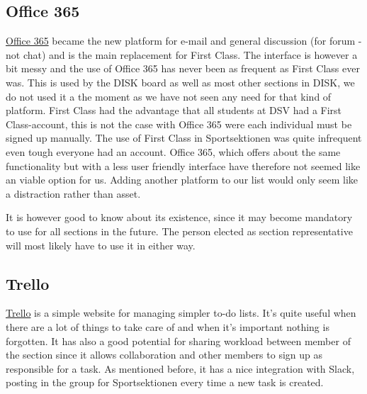 \documentclass[12pt,a4paper]{article}
\begin{document}
		\subsection{Office 365}
			\href{http://portal.office.com}{Office 365} became the new platform for e-mail and general discussion (for forum - not chat) and is the main replacement for First Class. The interface is however a bit messy and the use of Office 365 has never been as frequent as First Class ever was. This is used by the DISK board as well as most other sections in DISK, we do not used it a the moment as we have not seen any need for that kind of platform. First Class had the advantage that all students at DSV had a First Class-account, this is not the case with Office 365 were each individual must be signed up manually. The use of First Class in Sportsektionen was quite infrequent even tough everyone had an account. Office 365, which offers about the same functionality but with a less user friendly interface have therefore not seemed like an viable option for us. Adding another platform to our list would only seem like a distraction rather than asset.

			It is however good to know about its existence, since it may become mandatory to use for all sections in the future. The person elected as section representative will most likely have to use it in either way.
		\subsection{Trello}
			\href{https://trello.com/b/ez76bD5J/sportsektionen}{Trello} is a simple website for managing simpler to-do lists. It's quite useful when there are a lot of things to take care of and when it's important nothing is forgotten. It has also a good potential for sharing workload between member of the section since it allows collaboration and other members to sign up as responsible for a task. As mentioned before, it has a nice integration with Slack, posting in the group for Sportsektionen every time a new task is created.
\end{document}
